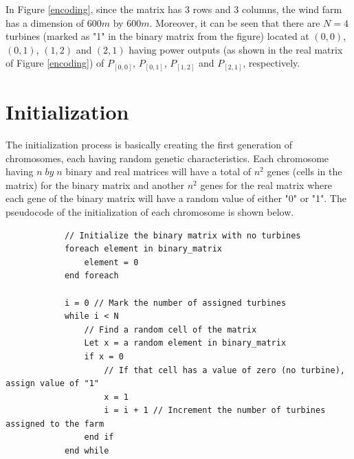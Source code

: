             In Figure \ref{encoding}, since the matrix has 3 rows and 3 columns, the wind farm has a dimension of $600m$ by $600m$. Moreover, it can be seen that there are $N=4$ turbines (marked as "1" in the binary matrix from the figure) located at $(0,0)$, $(0,1)$, $(1,2)$ and $(2,1)$ having power outputs (as shown in the real matrix of Figure \ref{encoding}) of $P_{[0,0]}$, $P_{[0,1]}$, $P_{[1,2]}$ and $P_{[2,1]}$, respectively.
            
        \section{Initialization}
            \par The initialization process is basically creating the first generation of chromosomes, each having random genetic characteristics. Each chromosome having $n\;by\;n$ binary and real matrices will have a total of $n^2$ genes (cells in the matrix) for the binary matrix and another $n^2$ genes for the real matrix where each gene of the binary matrix will have a random value of either "0" or "1". The pseudocode of the initialization of each chromosome is shown below.
                    
                    \singlespacing
        \begin{lstlisting}
            // Initialize the binary matrix with no turbines
            foreach element in binary_matrix
                element = 0
            end foreach
            
            i = 0 // Mark the number of assigned turbines
            while i < N
                // Find a random cell of the matrix
                Let x = a random element in binary_matrix
                if x = 0
                    // If that cell has a value of zero (no turbine), assign value of "1"
                    x = 1
                    i = i + 1 // Increment the number of turbines assigned to the farm
                end if
            end while
        \end{lstlisting}
        \doublespacing
        

